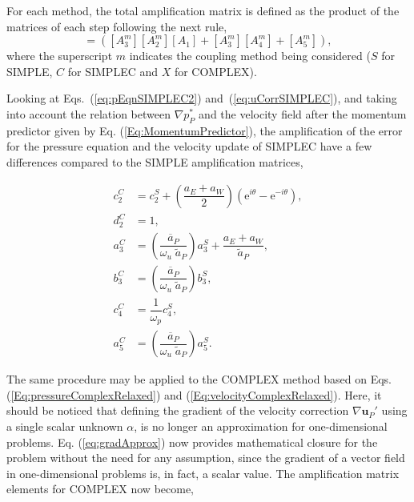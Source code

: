 \documentclass[final,3p,times,11pt,onecolumn]{myElsarticle}
\numberwithin{equation}{section}
\begin{document}
For each method, the total amplification matrix is defined as the product of the matrices of each step following the next rule,
\begin{equation}
[A^m] = ([A^m_3] [A^m_2] [A_1] + [A^m_3] [A^m_4] + [A^m_5]),
\end{equation}
where the superscript $m$ indicates the coupling method being considered ($S$ for SIMPLE, $C$ for SIMPLEC and $X$ for COMPLEX).

Looking at Eqs.~(\ref{eq:pEqnSIMPLEC2}) and~(\ref{eq:uCorrSIMPLEC}), and taking into account the relation between $\nabla p_P^*$ and the velocity field after the momentum predictor given by Eq. (\ref{Eq:MomentumPredictor}), the amplification of the error for the pressure equation and the velocity update of SIMPLEC have a few differences compared to the SIMPLE amplification matrices,

\begin{equation}
\begin{split}
     c^C_2 &= c_2^S + \left(\dfrac{a_E + a_W}{2}\right) (\text{e}^{i    \theta} - \text{e}^{-i \theta}), \\
     d^C_2 &= 1, \\
     a^C_3 &= \left(\dfrac{\overline{a}_P}{\omega_u \; \tilde{a}_P}\right) a_3^S + \dfrac{a_E+a_W}{\tilde{a}_P}, \\
     b^C_3 &= \left(\dfrac{\overline{a}_P}{\omega_u \; \tilde{a}_P}\right) b_3^S, \\ 
     c^C_4 &= \dfrac{1}{\omega_p} c^S_4, \\
     a^C_5 &= \left(\dfrac{\overline{a}_P}{\omega_u \; \tilde{a}_P}\right) a^S_5. 
\end{split}
\end{equation}

The same procedure may be applied to the COMPLEX method based on Eqs. (\ref{Eq:pressureComplexRelaxed}) and (\ref{Eq:velocityComplexRelaxed}). Here, it should be noticed that defining the gradient of the velocity correction $\nabla \boldsymbol{u}_P'$ using a single scalar unknown $\alpha$, is no longer an approximation for one-dimensional problems. Eq. (\ref{eq:gradApprox}) now provides mathematical closure for the problem without the need for any assumption, since the gradient of a vector field in one-dimensional problems is, in fact, a scalar value. The amplification matrix elements for COMPLEX now become,
\end{document}
